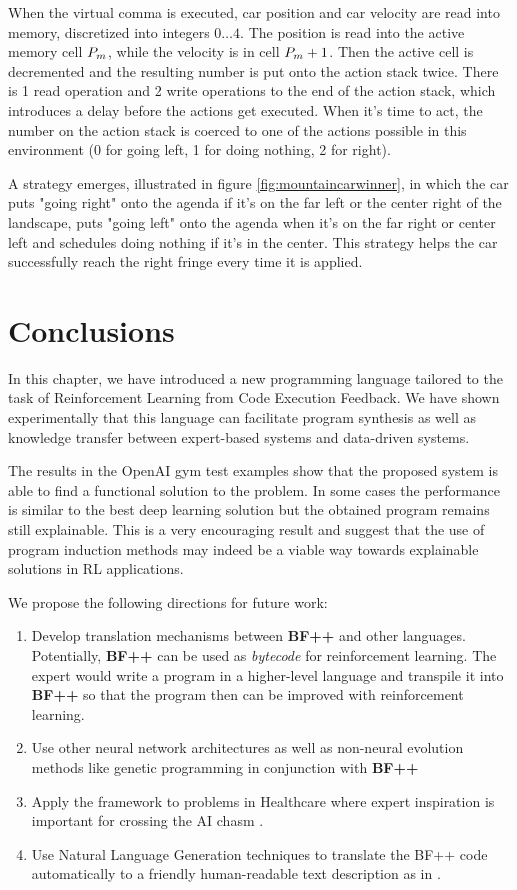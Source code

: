 When the virtual comma is executed, car position and car velocity are read into memory, discretized into integers $0\dots4$.
The position is read into the active memory cell $P_m$, while the velocity is in cell $P_m+1$.
Then the active cell is decremented and the resulting number is put onto the action stack twice.
There is 1 read operation and 2 write operations to the end of the action stack, which introduces a delay before the actions get executed.
When it's time to act, the number on the action stack is coerced to one of the actions possible in this environment (0 for going left, 1 for doing nothing, 2 for right). 

A strategy emerges, illustrated in figure \ref{fig:mountaincarwinner}, in which the car puts "going right" onto the agenda if it's on the far left or the center right of the landscape, puts "going left" onto the agenda when it's on the far right or center left and schedules doing nothing if it's in the center.
This strategy helps the car successfully reach the right fringe every time it is applied.

\newpage
\section{Conclusions}
\label{sec:bfpp-conclusion}

In this chapter, we have introduced a new programming language tailored to the task of Reinforcement Learning from Code Execution Feedback.
We have shown experimentally that this language can facilitate program synthesis as well as knowledge transfer between expert-based systems and data-driven systems. 

The results in the OpenAI gym test examples show that the proposed system is able to find a functional solution to the problem. In some cases the performance is similar to the best deep learning solution but the obtained program remains still explainable. This is a very encouraging result and suggest that the use of program induction methods may indeed be a viable way towards explainable solutions in RL applications. 

We propose the following directions for future work:
\begin{enumerate}
    \item Develop translation mechanisms between \textbf{BF++} and other languages. Potentially, \textbf{BF++} can be used as \emph{bytecode} \cite{bytecode} for reinforcement learning. The expert would write a program in a higher-level language and transpile it into \textbf{BF++} so that the program then can be improved with reinforcement learning.
    \item Use other neural network architectures as well as non-neural evolution methods like genetic programming \cite{genprog1,genprog2} in conjunction with \textbf{BF++}
    \item Apply the framework to problems in Healthcare where expert inspiration is important for crossing the AI chasm \cite{aichasm}.    \item Use Natural Language Generation techniques to translate the BF++ code automatically to a friendly human-readable text description as in \cite{richardsonCode2TextChallengeText2017,code2nlg2}.
\end{enumerate}